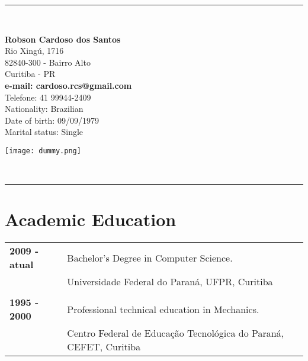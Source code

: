 \documentclass[pdftex, a4paper, 11pt]{article}
\begin{document}
\vspace*{.3cm}
\begin{center}
  \rule{.8\textwidth}{1pt}\\[10pt]
  \begin{minipage}{.55\textwidth}
    \LARGE\textbf{Robson Cardoso dos Santos}\\[13pt]
    \small Rio Xingú, 1716\\
    82840-300 - Bairro Alto\\
    Curitiba - PR\\[6pt]
    \textbf{e-mail: cardoso.rcs@gmail.com}\\
    Telefone: 41 99944-2409\\[6pt]
    \small Nationality: Brazilian\\
    \small Date of birth: 09/09/1979\\
    \small Marital status: Single\\
  \end{minipage}
  \begin{minipage}{.2\textwidth}
    \texttt{[image: dummy.png]}
  \end{minipage}\\[5pt]
  \rule{.8\textwidth}{1pt}
\end{center}
\vspace*{1cm}



\section*{Academic Education}
\begin{tabular}{ll}
  \textbf{2009 - atual} & Bachelor's Degree in Computer Science.\\
  & Universidade Federal do Paraná, UFPR, Curitiba\\
  & \\
  \textbf{1995 - 2000} & Professional technical education in Mechanics.\\
  & Centro Federal de Educação Tecnológica do Paraná, CEFET, Curitiba\\
\end{tabular}
\end{document}
